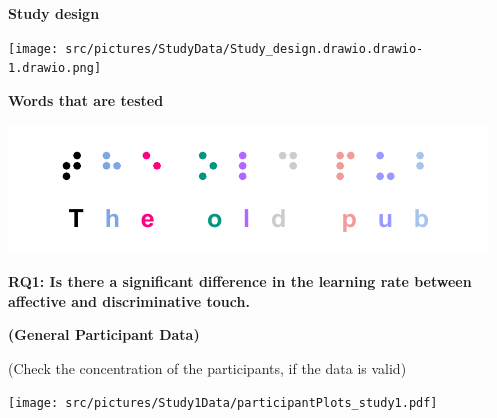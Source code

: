 

\textbf{Study design}

    \centering
    \texttt{[image: src/pictures/StudyData/Study\_design.drawio.drawio-1.drawio.png]}

\textbf{Words that are tested}


    \centering
    \includegraphics[width=.75\linewidth]{src/pictures/braille_prestudy_characters.drawio.pdf}


 
\textbf{RQ1: Is there a significant difference in the learning rate between affective and discriminative touch.}

\textbf{(General Participant Data)}



(Check the concentration of the participants, if the data is valid)

    \centering
    \texttt{[image: src/pictures/Study1Data/participantPlots\_study1.pdf]}



